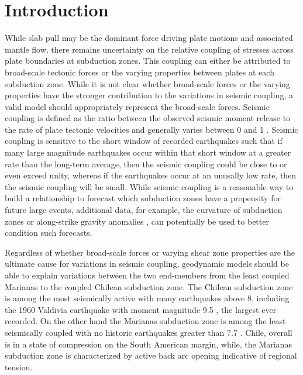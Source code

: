 \documentclass[12pt]{article}
\begin{document}
\section{Introduction}
While slab pull may be the dominant force driving plate motions and associated mantle flow, there remains uncertainty on the relative coupling of stresses across plate boundaries at subduction zones. This coupling can either be attributed to broad-scale tectonic forces or the varying properties between plates at each subduction zone. While it is not clear whether broad-scale forces or the varying properties have the stronger contribution to the variations in seismic coupling, a valid model should appropriately represent the broad-scale forces. 
Seismic coupling is defined as the ratio between the observed seismic moment release to the rate of plate tectonic velocities and generally varies between 0 and 1 \citep{davies1971regional}. 
Seismic coupling is sensitive to the short window of recorded earthquakes such that if many large magnitude earthquakes occur within that short window 
at a greater rate than the long-term average, then the seismic coupling could be close to or even exceed unity, whereas if the earthquakes occur at an unusally low rate, then the seismic coupling will be small.  While seismic coupling is a reasonable way to build a relationship to forecast which subduction zones have a propensity for future large events, additional data, for example, the curvature of subduction zones \citep{bletery2016mega} or along-strike gravity anomalies \citep{song2003large}, 
can potentially be used to better condition such forecasts. 


Regardless of whether broad-scale forces or varying shear zone properties are the ultimate cause for variations in seismic coupling, geodynamic models should be able to explain variations between the two end-members from the least coupled Marianas to the coupled Chilean subduction zone. 
The Chilean subduction zone is among the most seismically active with many earthquakes above 8, including the 1960 Valdivia earthquake with moment magnitude 9.5 \citep{kanamori1974},
the largest ever recorded. 
On the other hand the Marianas subduction zone is among the least seismically coupled with no historic earthquakes greater than 7.7 \citep{mccaffrey2008global}. 
Chile, overall is in a state of compression on the South American margin, while, the Marianas subduction zone is characterized by active back arc opening indicative of regional tension.
\end{document}
